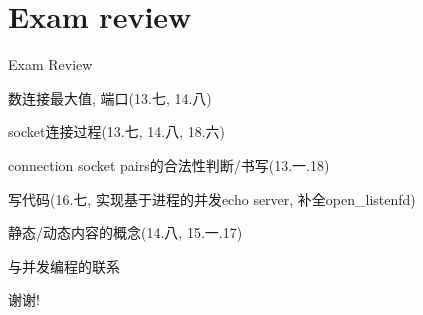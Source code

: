 \documentclass[]{beamer}
\begin{document}
\section{Exam review}

\begin{frame}{Exam Review}

	数连接最大值, 端口(13.七, 14.八)
	
	socket连接过程(13.七, 14.八, 18.六)
	
	connection socket pairs的合法性判断/书写(13.一.18)
	
	写代码(16.七, 实现基于进程的并发echo server, 补全open\_listenfd)
	
	静态/动态内容的概念(14.八, 15.一.17) 
	
	与并发编程的联系
\end{frame}

\begin{frame}
\begin{center}
   \LARGE{谢谢!}
\end{center}
\end{frame}
\end{document}
